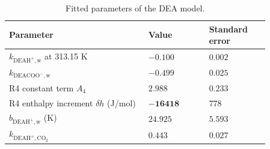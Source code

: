 \begin{table}[pos=!htbp]\small\setlength{\tabcolsep}{2pt}\caption{Fitted parameters of the DEA model.}\label{tab:dea-fitted}
\begin{tabular}{@{}>{\raggedright\arraybackslash}p{0.46\linewidth}>{\raggedright\arraybackslash}p{0.2\linewidth}>{\raggedright\arraybackslash}p{0.2\linewidth}@{}}
\toprule Parameter & Value & Standard error \\ \midrule
$k_{\mathrm{DEAH^+,w}}$ at 313.15 K & $\boldsymbol{-0.100}$ & $0.002$ \\
$k_{\mathrm{DEACOO^-,w}}$ & $\boldsymbol{-0.499}$ & $0.025$ \\
R4 constant term $A_4$ & $\boldsymbol{2.988}$ & $0.233$ \\
R4 enthalpy increment $\delta h$ (J/mol) & $\boldsymbol{-16418}$ & $778$ \\
$b_{\mathrm{DEAH^+,w}}$ (K) & $\boldsymbol{24.925}$ & $5.593$ \\
$k_{\mathrm{DEAH^+,CO_2}}$ & $\boldsymbol{0.443}$ & $0.027$ \\
\bottomrule\end{tabular}
\par{}\end{table}
